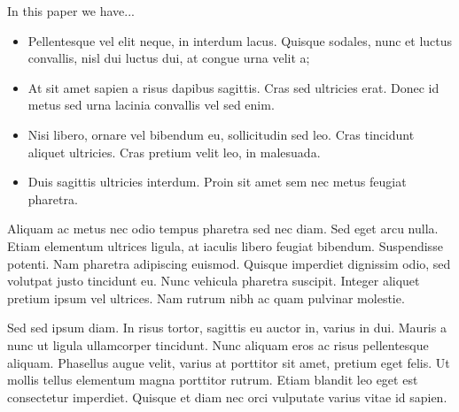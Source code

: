\documentclass[a4paper,fleqn,usenatbib]{mnras}
\begin{document}
In this paper we have... 
\begin{itemize}
\item Pellentesque vel elit neque, in interdum lacus. Quisque sodales, nunc et luctus convallis, nisl dui luctus dui, at congue urna velit a; 
\item At sit amet sapien a risus dapibus sagittis. Cras sed ultricies erat. Donec id metus sed urna lacinia convallis vel sed enim. 
\item Nisi libero, ornare vel bibendum eu, sollicitudin sed leo. Cras tincidunt aliquet ultricies. Cras pretium velit leo, in malesuada. 
\item Duis sagittis ultricies interdum. Proin sit amet sem nec metus feugiat pharetra.
\end{itemize}

Aliquam ac metus nec odio tempus pharetra sed nec diam. Sed eget arcu
nulla. Etiam elementum ultrices ligula, at iaculis libero feugiat
bibendum. Suspendisse potenti. Nam pharetra adipiscing
euismod. Quisque imperdiet dignissim odio, sed volutpat justo
tincidunt eu. Nunc vehicula pharetra suscipit. Integer aliquet pretium
ipsum vel ultrices. Nam rutrum nibh ac quam pulvinar molestie.

Sed sed ipsum diam. In risus tortor, sagittis eu auctor in, varius in
dui. Mauris a nunc ut ligula ullamcorper tincidunt. Nunc aliquam eros
ac risus pellentesque aliquam. Phasellus augue velit, varius at
porttitor sit amet, pretium eget felis. Ut mollis tellus elementum
magna porttitor rutrum. Etiam blandit leo eget est consectetur
imperdiet. Quisque et diam nec orci vulputate varius vitae id sapien.






\bsp	%
\label{lastpage}
\end{document}
